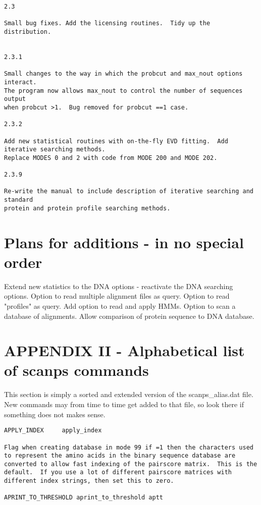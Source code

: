 \documentclass[12pt]{article}
\begin{document}
\begin{scriptsize}
\begin{verbatim}
2.3

Small bug fixes. Add the licensing routines.  Tidy up the distribution.


2.3.1

Small changes to the way in which the probcut and max_nout options interact.
The program now allows max_nout to control the number of sequences output
when probcut >1.  Bug removed for probcut ==1 case.

2.3.2

Add new statistical routines with on-the-fly EVD fitting.  Add iterative searching methods.
Replace MODES 0 and 2 with code from MODE 200 and MODE 202.

2.3.9

Re-write the manual to include description of iterative searching and standard
protein and protein profile searching methods.

\end{verbatim}


\section{Plans for additions - in no special order}

Extend new statistics to the DNA options - reactivate the DNA searching options.
Option to read multiple alignment files as query.
Option to read "profiles" as query.
Add option to read and apply HMMs.
Option to scan a database of alignments.
Allow comparison of protein sequence to DNA database.

\section{APPENDIX II - Alphabetical list of scanps commands}

This section is simply a sorted and extended version of the
scanps\_alias.dat file.  New commands may from time to time get added
to that file, so look there if something does not makes sense.

\begin{verbatim}
APPLY_INDEX     apply_index	

Flag when creating database in mode 99 if =1 then the characters used
to represent the amino acids in the binary sequence database are
converted to allow fast indexing of the pairscore matrix.  This is the
default.  If you use a lot of different pairscore matrices with
different index strings, then set this to zero.

APRINT_TO_THRESHOLD aprint_to_threshold aptt  


\end{verbatim}
\end{scriptsize}
\end{document}
